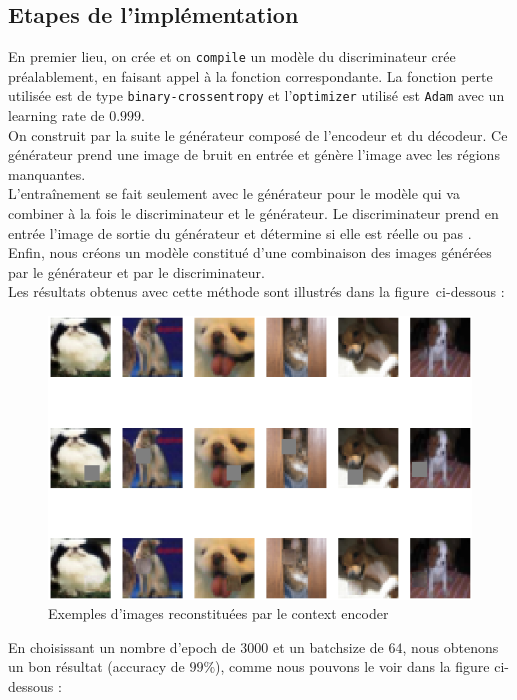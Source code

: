 \documentclass[11pt,a4paper]{article}
\begin{document}
        \subsection{Etapes de l'implémentation}  
        En premier lieu, on crée et on \texttt{compile} un modèle du discriminateur crée préalablement, en faisant appel à la fonction correspondante. La fonction perte utilisée est de type \texttt{binary-crossentropy} et l’\texttt{optimizer} utilisé est \texttt{Adam} avec un learning rate de $0.999$.\\ 
        On construit par la suite le générateur composé de l’encodeur et du décodeur. Ce générateur prend une image de bruit en entrée et génère l'image avec les régions manquantes. \\
        L’entraînement se fait seulement avec le générateur pour le modèle qui va combiner à la fois le discriminateur et le générateur. Le discriminateur prend en entrée l'image de sortie du générateur et détermine si elle est réelle ou pas .\\
        Enfin, nous créons un modèle constitué d'une combinaison des images générées par le générateur et par le discriminateur.\\
        Les résultats obtenus avec cette méthode sont illustrés dans la figure ci-dessous :
        \begin{figure}[H]
            \centering
            \includegraphics[scale=0.35]{resultat.png} 
            \caption{Exemples d'images reconstituées par le context encoder}
        \end{figure}
        En choisissant un nombre d'epoch de $3000$ et un batchsize de $64$, nous obtenons un bon résultat (accuracy de $99\%$), comme nous pouvons le voir dans la figure ci-dessous :
\end{document}
